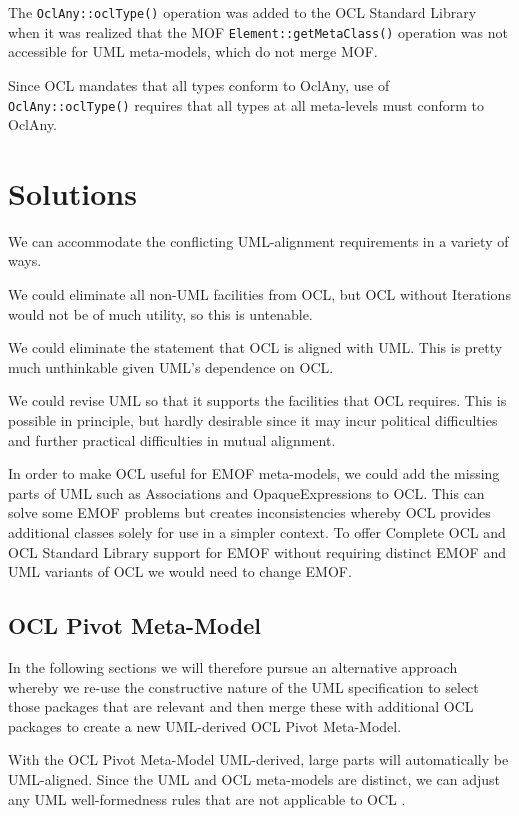 \documentclass{eceasst}
\begin{document}
The \verb|OclAny::oclType()| operation was added to the OCL Standard Library when it was realized that the MOF \verb|Element::getMetaClass()| operation was not accessible for UML meta-models, which do not merge MOF.

Since OCL mandates that all types conform to OclAny, use of \verb|OclAny::oclType()| requires that all types at all meta-levels must conform to OclAny.   

\section{Solutions}\label{Solutions}

We can accommodate the conflicting UML-alignment requirements in a variety of ways.

We could eliminate all non-UML facilities from OCL, but OCL without Iterations would not be of much utility, so this is untenable.

We could eliminate the statement that OCL is aligned with UML. This is pretty much unthinkable given UML's dependence on OCL.

We could revise UML so that it supports the facilities that OCL requires. This is possible in principle, but hardly desirable since it may incur political difficulties and further practical difficulties in mutual alignment.

In order to make OCL useful for EMOF meta-models, we could add the missing parts of UML such as Associations and OpaqueExpressions to OCL. This can solve some EMOF problems but creates inconsistencies whereby OCL provides additional classes solely for use in a simpler context. To offer Complete OCL and OCL Standard Library support for EMOF without requiring distinct EMOF and UML variants of OCL we would need to change EMOF.

\subsection{OCL Pivot Meta-Model}\label{PivotMetaModel}

In the following sections we will therefore pursue an alternative approach whereby we re-use the constructive nature of the UML specification to select those packages that are relevant and then merge these with additional OCL packages to create a new UML-derived OCL Pivot Meta-Model.

With the OCL Pivot Meta-Model UML-derived, large parts will automatically be UML-aligned. Since the UML and OCL meta-models are distinct, we can adjust any UML well-formedness rules that are not applicable to OCL .
\end{document}
